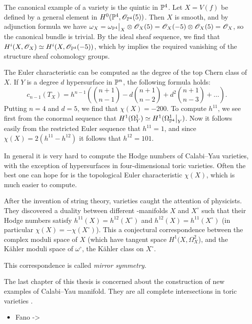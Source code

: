 \begin{example}
The canonical example of a \CY variety is the quintic in $\P^4$. Let $X=V(f)$ be defined by a general element in $H^0(\P^4,\OO_{\P^4}(5))$. Then $X$ is smooth, and by adjunction formula we have $\omega_X = \restr{\omega_{\P^4}}{X} \otimes \OO_X(5)=\OO_X(-5) \otimes \OO_X(5) = \OO_X$, so the canonical bundle is trivial. By the ideal sheaf sequence, we find that $H^i(X,\OO_X) \simeq H^i(X,\OO_{\P^4}(-5))$, which by \cite[Theorem 5.1, Chapter III]{hartshorne} implies the required vanishing of the structure sheaf cohomology groups.

The Euler characteristic can be computed as the degree of the top Chern class of $X$. If $Y$ is a degree $d$ hypersurface in $\P^n$, the following formula holds:
$$
c_{n-1}(T_X) = h^{n-1} \left( \binom{n+1}{n-1} - d \binom{n+1}{n-2} + d^2 \binom{n+1}{n-3} + \ldots\right).
$$
Putting $n=4$ and $d=5$, we find that $\chi(X)=-200$. To compute $h^{11}$, we see first from the conormal sequence that $H^1(\Omega_Y^1) \simeq H^1(\restr{\Omega_{\P^4}^1}{Y})$. Now it follows easily from the restricted Euler sequence that $h^{11}=1$, and since $\chi(X)=2(h^{11}-h^{12})$ it follows that $h^{12}=101$.
\end{example}

In general it is very hard to compute the Hodge numbers of Calabi--Yau varieties, with the exception of hypersurfaces in four-dimensional toric varieties. Often the best one can hope for is the topological Euler characteristic $\chi(X)$, which is much easier to compute.

After the invention of string theory, \CY varieties caught the attention of physicists. They discovered a duality between different -manifolds $X$ and $X^\circ$ such that their Hodge numbers satisfy $h^{11}(X) = h^{12}(X^\circ)$ and $h^{12}(X)=h^{11}(X^\circ)$ (in particular $\chi(X) = - \chi(X^\circ)$). This a conjectural correspondence between the complex moduli space of $X$ (which have tangent space $H^1(X,\Omega_X^2$), and the Kähler moduli space of $\omega^\circ$, the Kähler class on $X^\circ$.

This correspondence is called \emph{mirror symmetry}.

The last chapter of this thesis is concerned about the construction of new examples of Calabi--Yau manifold. They are all complete intersections in toric varieties .

\begin{itemize}
	\item Fano -> \CY
\end{itemize}

